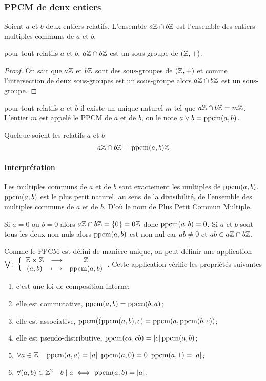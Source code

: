 \subsubsection{PPCM de deux entiers}

Soient \(a\) et \(b\) deux entiers relatifs. L'ensemble \(a\mathbb{Z} \cap b\mathbb{Z}\) est l'ensemble des entiers multiples communs de \(a\) et \(b\).
\begin{theo}
  pour tout relatifs \(a\) et \(b\), \(a\mathbb{Z} \cap b\mathbb{Z}\) est un sous-groupe de \((\mathbb{Z},+)\).
\end{theo}
\begin{proof}
  On sait que \(a\mathbb{Z}\) et \(b\mathbb{Z}\) sont des sous-groupes de \((\mathbb{Z},+)\) et comme l'intersection de deux sous-groupes est un sous-groupe alors \(a\mathbb{Z} \cap b\mathbb{Z}\) est un sous-groupe.
\end{proof}
\begin{corth}
  pour tout relatifs \(a\) et \(b\) il existe un unique naturel \(m\) tel que \(a\mathbb{Z} \cap b\mathbb{Z}= m \mathbb{Z}\). L'entier \(m\) est appelé le PPCM de \(a\) et de \(b\), on le note \(a \vee b = \operatorname{ppcm}(a,b)\).
\end{corth}
\begin{theo}
  Quelque soient les relatifs \(a\) et \(b\)
  \begin{equation}
    a\mathbb{Z} \cap b\mathbb{Z} = \operatorname{ppcm}(a,b) \mathbb{Z}
  \end{equation}
\end{theo}

\paragraph{Interprétation}

Les multiples communs de \(a\) et de \(b\) sont exactement les multiples de \(\operatorname{ppcm}(a,b)\). \(\operatorname{ppcm}(a,b)\) est le plus petit naturel, au sens de la divisibilité, de l'ensemble des multiples communs de \(a\) et de \(b\). D'où le nom de Plus Petit Commun Multiple.

Si \(a=0\) ou \(b=0\) alors \(a\mathbb{Z} \cap b\mathbb{Z} = \{0\}=0\mathbb{Z}\) donc \(\operatorname{ppcm}(a,b)=0\). Si \(a\) et \(b\) sont tous les deux non nuls alors \(\operatorname{ppcm}(a,b)\) est non nul car \(ab \neq 0\) et \(ab \in a\mathbb{Z} \cap b\mathbb{Z}\).

\begin{prop}
  Comme le PPCM est défini de manière unique, on peut définir une application \(\bigvee\colon \left\{\begin{array}{ccc} \mathbb{Z}\times\mathbb{Z} & \longrightarrow &\mathbb{Z}\\ (a,b) & \longmapsto & \operatorname{ppcm}(a,b) \end{array} \right.\). Cette application vérifie les propriétés suivantes
  \begin{enumerate}
    \item c'est une loi de composition interne;
    \item elle est commutative, \(\operatorname{ppcm}(a,b)=\operatorname{ppcm}(b,a)\);
    \item elle est associative, \(\operatorname{ppcm}((\operatorname{ppcm}(a,b),c)=\operatorname{ppcm}(a,\operatorname{ppcm}(b,c))\);
    \item elle est pseudo-distributive, \(\operatorname{ppcm}(ca,cb)=\left\lvert c\right\rvert\operatorname{ppcm}(a,b)\);
    \item \(\forall a \in \Z \quad \ppcm(a,a)=\abs{a} \ \ppcm(a,0) = 0 \ \ppcm(a,1)=\abs{a}\);
    \item \(\forall (a,b) \in \mathbb{Z}^2 \quad b\mid a \iff \operatorname{ppcm}(a,b)=\left\lvert a\right\rvert\).
  \end{enumerate}
\end{prop}


